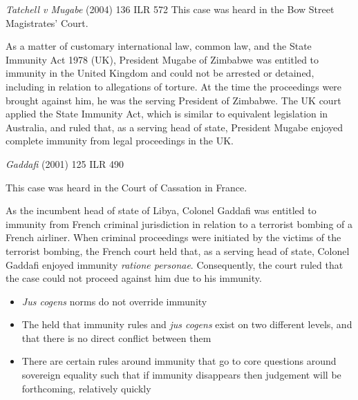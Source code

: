 \begin{casedetails}{\textit{Tatchell v Mugabe} (2004) 136 ILR 572}
    \flushleft
    This case was heard in the Bow Street Magistrates' Court.

    \vspace{\baselineskip}

    As a matter of customary international law, common law, and the State Immunity Act 1978 (UK), President Mugabe of Zimbabwe was entitled to immunity in the United Kingdom and could not be arrested or detained, including in relation to allegations of torture. At the time the proceedings were brought against him, he was the serving President of Zimbabwe. The UK court applied the State Immunity Act, which is similar to equivalent legislation in Australia, and ruled that, as a serving head of state, President Mugabe enjoyed complete immunity from legal proceedings in the UK.
\end{casedetails}

\begin{casedetails}{\textit{Gaddafi} (2001) 125 ILR 490}
    \flushleft

    This case was heard in the Court of Cassation in France.

    \vspace{\baselineskip}

    As the incumbent head of state of Libya, Colonel Gaddafi was entitled to immunity from French criminal jurisdiction in relation to a terrorist bombing of a French airliner. When criminal proceedings were initiated by the victims of the terrorist bombing, the French court held that, as a serving head of state, Colonel Gaddafi enjoyed immunity \textit{ratione personae}. Consequently, the court ruled that the case could not proceed against him due to his immunity.
\end{casedetails}

\begin{itemize}
    \item \textit{Jus cogens} norms do not override immunity
    \item The  held that immunity rules and \textit{jus cogens} exist on two different levels, and that there is no direct conflict between them
    \item There are certain rules around immunity that go to core questions around sovereign equality such that if immunity disappears then judgement will be forthcoming, relatively quickly
\end{itemize}

